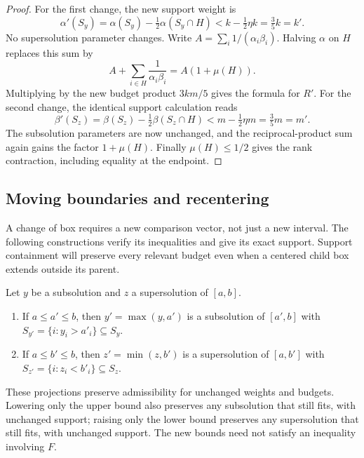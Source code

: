 \begin{proof}
For the first change, the new support weight is
\[
 \alpha'(S_y)=\alpha(S_y)-\tfrac12\alpha(S_y\cap H)
 <k-\tfrac12\eta k=\tfrac35k=k'.
\]
No supersolution parameter changes. Write
$A=\sum_i1/(\alpha_i\beta_i)$. Halving $\alpha$ on $H$ replaces this
sum by
\[
 A+\sum_{i\in H}\frac1{\alpha_i\beta_i}=A(1+\mu(H)).
\]
Multiplying by the new budget product $3km/5$ gives the formula for
$R'$. For the second change, the identical support calculation reads
\[
 \beta'(S_z)=\beta(S_z)-\tfrac12\beta(S_z\cap H)
 <m-\tfrac12\eta m=\tfrac35m=m'.
\]
The subsolution parameters are now unchanged, and the reciprocal-product
sum again gains the factor $1+\mu(H)$. Finally $\mu(H)\le1/2$ gives
the rank contraction, including equality at the endpoint.
\end{proof}

\subsection{Moving boundaries and recentering}

A change of box requires a new comparison vector, not just a new
interval. The following constructions verify its inequalities and give
its exact support. Support containment will preserve every relevant
budget even when a centered child box extends outside its parent.

\begin{lemma}\label{lem:boundary-projections}
Let $y$ be a subsolution and $z$ a supersolution of $[a,b]$.
\begin{enumerate}[label=\textup{(\roman*)}]
\item If $a\le a'\le b$, then $y'=\max(y,a')$ is a subsolution of
$[a',b]$ with $S_{y'}=\{i:y_i>a'_i\}\subseteq S_y$.
\item If $a\le b'\le b$, then $z'=\min(z,b')$ is a supersolution of
$[a,b']$ with $S_{z'}=\{i:z_i<b'_i\}\subseteq S_z$.
\end{enumerate}
These projections preserve admissibility for unchanged weights and
budgets. Lowering only the upper bound also preserves any subsolution
that still fits, with unchanged support; raising only the lower bound
preserves any supersolution that still fits, with unchanged support.
The new bounds need not satisfy an inequality involving $F$.
\end{lemma}

